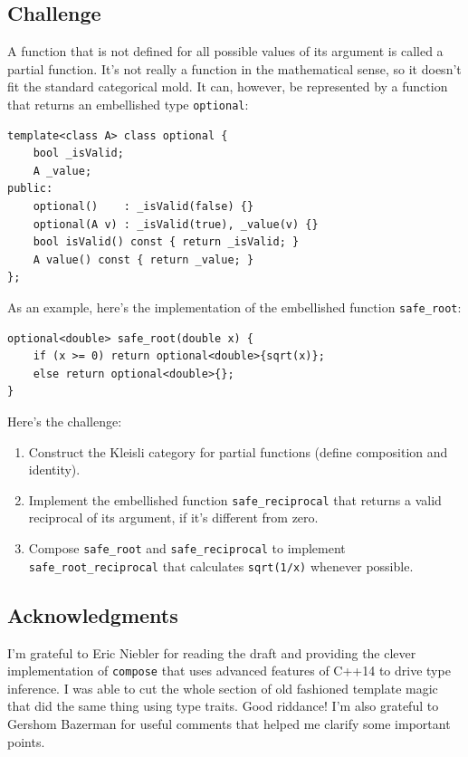 \subsection{Challenge}\label{challenge}

A function that is not defined for all possible values of its argument
is called a partial function. It's not really a function in the
mathematical sense, so it doesn't fit the standard categorical mold. It
can, however, be represented by a function that returns an embellished
type \texttt{optional}:

\begin{verbatim}
template<class A> class optional {
    bool _isValid;
    A _value;
public: 
    optional()    : _isValid(false) {}
    optional(A v) : _isValid(true), _value(v) {}
    bool isValid() const { return _isValid; }
    A value() const { return _value; }
};
\end{verbatim}

As an example, here's the implementation of the embellished function
\texttt{safe\_root}:

\begin{verbatim}
optional<double> safe_root(double x) {
    if (x >= 0) return optional<double>{sqrt(x)}; 
    else return optional<double>{};
}
\end{verbatim}

Here's the challenge:

\begin{enumerate}
\tightlist
\item
  Construct the Kleisli category for partial functions (define
  composition and identity).
\item
  Implement the embellished function \texttt{safe\_reciprocal} that
  returns a valid reciprocal of its argument, if it's different from
  zero.
\item
  Compose \texttt{safe\_root} and \texttt{safe\_reciprocal} to implement\\
  \texttt{safe\_root\_reciprocal} that calculates \texttt{sqrt(1/x)}
  whenever possible.
\end{enumerate}

\subsection{Acknowledgments}\label{acknowledgments}

I'm grateful to Eric Niebler for reading the draft and providing the
clever implementation of \texttt{compose} that uses advanced features of
C++14 to drive type inference. I was able to cut the whole section of
old fashioned template magic that did the same thing using type traits.
Good riddance! I'm also grateful to Gershom Bazerman for useful comments
that helped me clarify some important points.